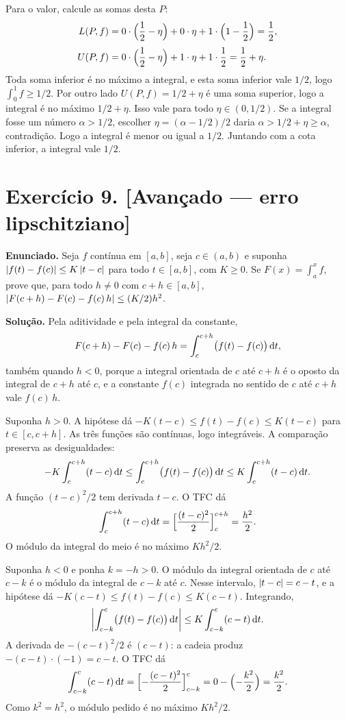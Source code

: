 \documentclass[11pt,a4paper]{article}
\begin{document}
Para o valor, calcule as somas desta $P$:
\begin{align*}
L(P,f)
&=0\cdot\Bigl(\frac12-\eta\Bigr)+0\cdot\eta+1\cdot\Bigl(1-\frac12\Bigr)
=\frac12,\\[0.3em]
U(P,f)
&=0\cdot\Bigl(\frac12-\eta\Bigr)+1\cdot\eta+1\cdot\frac12
=\frac12+\eta.
\end{align*}
Toda soma inferior é no máximo a integral, e esta soma inferior vale $1/2$, logo $\int_0^1 f\ge 1/2$. Por outro lado $U(P,f)=1/2+\eta$ é uma soma superior, logo a integral é no máximo $1/2+\eta$. Isso vale para todo $\eta\in(0,1/2)$. Se a integral fosse um número $\alpha>1/2$, escolher $\eta=(\alpha-1/2)/2$ daria $\alpha>1/2+\eta\ge\alpha$, contradição. Logo a integral é menor ou igual a $1/2$. Juntando com a cota inferior, a integral vale $1/2$.

\section*{Exercício 9. [Avançado --- erro lipschitziano]}

\textbf{Enunciado.} Seja $f$ contínua em $[a,b]$, seja $c\in(a,b)$ e suponha $\left\lvert f(t)-f(c) \right\rvert\le K\left\lvert t-c \right\rvert$ para todo $t\in[a,b]$, com $K\ge 0$. Se $F(x)=\int_a^x f$, prove que, para todo $h\neq 0$ com $c+h\in[a,b]$, $\left\lvert F(c+h)-F(c)-f(c)\,h \right\rvert\le (K/2)h^2$.

\textbf{Solução.}
Pela aditividade e pela integral da constante,
\[
F(c+h)-F(c)-f(c)\,h
=\int_c^{c+h}\bigl(f(t)-f(c)\bigr)\,\mathrm{d} t,
\]
também quando $h<0$, porque a integral orientada de $c$ até $c+h$ é o oposto da integral de $c+h$ até $c$, e a constante $f(c)$ integrada no sentido de $c$ até $c+h$ vale $f(c)\,h$.

Suponha $h>0$. A hipótese dá $-K(t-c)\le f(t)-f(c)\le K(t-c)$ para $t\in[c,c+h]$. As três funções são contínuas, logo integráveis. A comparação preserva as desigualdades:
\[
-K\int_c^{c+h}(t-c)\,\mathrm{d} t
\le\int_c^{c+h}\bigl(f(t)-f(c)\bigr)\,\mathrm{d} t
\le K\int_c^{c+h}(t-c)\,\mathrm{d} t.
\]
A função $(t-c)^2/2$ tem derivada $t-c$. O TFC dá
\[
\int_c^{c+h}(t-c)\,\mathrm{d} t
=\Bigl[\frac{(t-c)^2}{2}\Bigr]_c^{c+h}
=\frac{h^2}{2}.
\]
O módulo da integral do meio é no máximo $K h^2/2$.

Suponha $h<0$ e ponha $k=-h>0$. O módulo da integral orientada de $c$ até $c-k$ é o módulo da integral de $c-k$ até $c$. Nesse intervalo, $\left\lvert t-c \right\rvert=c-t$, e a hipótese dá $-K(c-t)\le f(t)-f(c)\le K(c-t)$. Integrando,
\[
\left\lvert \int_{c-k}^c\bigl(f(t)-f(c)\bigr)\,\mathrm{d} t \right\rvert
\le K\int_{c-k}^c(c-t)\,\mathrm{d} t.
\]
A derivada de $-(c-t)^2/2$ é $(c-t)$: a cadeia produz $-(c-t)\cdot(-1)=c-t$. O TFC dá
\[
\int_{c-k}^c(c-t)\,\mathrm{d} t
=\Bigl[-\frac{(c-t)^2}{2}\Bigr]_{c-k}^c
=0-\Bigl(-\frac{k^2}{2}\Bigr)
=\frac{k^2}{2}.
\]
Como $k^2=h^2$, o módulo pedido é no máximo $K h^2/2$.
\end{document}
